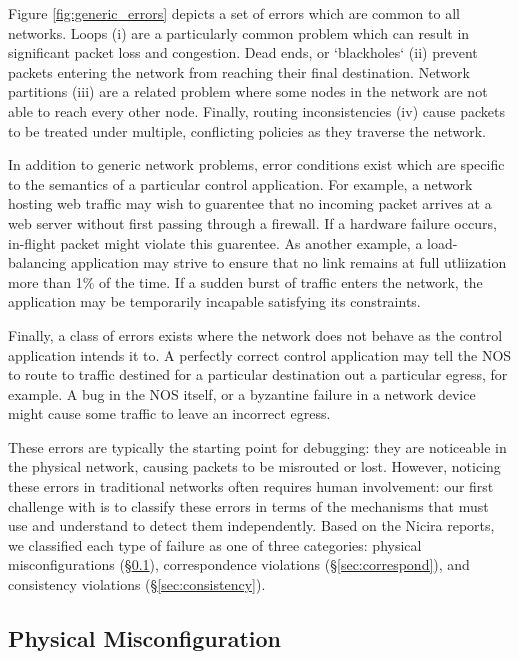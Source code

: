 Figure \ref{fig:generic_errors} depicts a set of errors which are
common to all networks. Loops (i) are a particularly common problem which
can result in significant packet loss and congestion. Dead ends, or
`blackholes` (ii) prevent packets entering the network from reaching their
final destination. Network partitions (iii) are a related problem where
some nodes in the network are not able to reach every other node. Finally, routing
inconsistencies (iv) cause packets to be treated under multiple, conflicting policies as
they traverse the network. 

In addition to generic network problems, error conditions exist which are
specific to the semantics of a particular control application. For example, a network
hosting web traffic may wish to guarentee that no incoming packet arrives
at a web server without first passing through a firewall. If a hardware
failure occurs, in-flight packet might violate this guarentee. As another
example, a load-balancing application may strive to ensure that no link
remains at full utliization more than 1\% of the time. If a sudden burst of
traffic enters the network, the application may be temporarily incapable
satisfying its constraints. 

Finally, a class of errors exists where the network does not behave as the
control application intends it to. A perfectly correct control application may
tell the NOS to route to traffic destined for a particular destination
out a particular egress, for example. A bug in the NOS itself, or a byzantine
failure in a network device might cause some traffic to leave an incorrect
egress.


These errors are typically the starting point for debugging: they are noticeable in the 
physical network, causing packets to be misrouted or lost.
However, noticing these errors in traditional networks often requires human involvement: our first challenge 
with \projectname{} is to classify these errors in terms of the mechanisms that \projectname{} must use and
understand to detect them independently.
Based on the Nicira reports, we classified each type of failure as one of three categories: physical misconfigurations (\S\ref{sec:dynamicmisconf}), correspondence violations (\S\ref{sec:correspond}), and consistency violations (\S\ref{sec:consistency}).


\subsection{Physical Misconfiguration}
\label{sec:dynamicmisconf}

